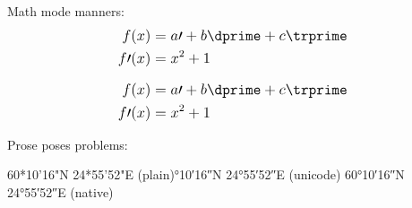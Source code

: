 \documentclass{article}
\begin{document}
\fontsize{12}{16}
\selectfont

Math mode manners:
\[\mathlarger{\begin{aligned}
	f(x) & = a\prime + b\dprime + c\trprime \\
	f\prime(x) & = x^{2} + 1
\end{aligned}}\]

\[\mathlarger{\begin{aligned}
	f(x) & = a\prime + b\dprime + c\trprime \\
	f\prime(x) & = x^{2} + 1
\end{aligned}}\]

Prose poses problems:
\smallskip

\raggedright{
	60*10'16"N 24*55'52"E (plain)°10′16″N 24°55′52″E (unicode)\break
	\ang{60;10;16}N \ang{24;55;52}E (native)
}
\end{document}
